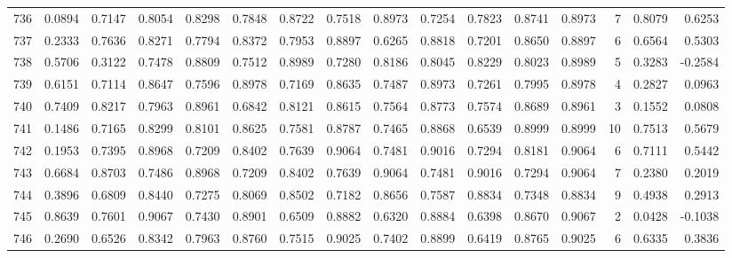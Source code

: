 \begin{tabular}{lrrrrrrrrrrrrrrr}
736 &      0.0894 &  0.7147 &  0.8054 &  0.8298 &  0.7848 &  0.8722 &  0.7518 &  0.8973 &  0.7254 &  0.7823 &   0.8741 &     0.8973 &      7 &                    0.8079 &                     0.6253 \\
737 &      0.2333 &  0.7636 &  0.8271 &  0.7794 &  0.8372 &  0.7953 &  0.8897 &  0.6265 &  0.8818 &  0.7201 &   0.8650 &     0.8897 &      6 &                    0.6564 &                     0.5303 \\
738 &      0.5706 &  0.3122 &  0.7478 &  0.8809 &  0.7512 &  0.8989 &  0.7280 &  0.8186 &  0.8045 &  0.8229 &   0.8023 &     0.8989 &      5 &                    0.3283 &                    -0.2584 \\
739 &      0.6151 &  0.7114 &  0.8647 &  0.7596 &  0.8978 &  0.7169 &  0.8635 &  0.7487 &  0.8973 &  0.7261 &   0.7995 &     0.8978 &      4 &                    0.2827 &                     0.0963 \\
740 &      0.7409 &  0.8217 &  0.7963 &  0.8961 &  0.6842 &  0.8121 &  0.8615 &  0.7564 &  0.8773 &  0.7574 &   0.8689 &     0.8961 &      3 &                    0.1552 &                     0.0808 \\
741 &      0.1486 &  0.7165 &  0.8299 &  0.8101 &  0.8625 &  0.7581 &  0.8787 &  0.7465 &  0.8868 &  0.6539 &   0.8999 &     0.8999 &     10 &                    0.7513 &                     0.5679 \\
742 &      0.1953 &  0.7395 &  0.8968 &  0.7209 &  0.8402 &  0.7639 &  0.9064 &  0.7481 &  0.9016 &  0.7294 &   0.8181 &     0.9064 &      6 &                    0.7111 &                     0.5442 \\
743 &      0.6684 &  0.8703 &  0.7486 &  0.8968 &  0.7209 &  0.8402 &  0.7639 &  0.9064 &  0.7481 &  0.9016 &   0.7294 &     0.9064 &      7 &                    0.2380 &                     0.2019 \\
744 &      0.3896 &  0.6809 &  0.8440 &  0.7275 &  0.8069 &  0.8502 &  0.7182 &  0.8656 &  0.7587 &  0.8834 &   0.7348 &     0.8834 &      9 &                    0.4938 &                     0.2913 \\
745 &      0.8639 &  0.7601 &  0.9067 &  0.7430 &  0.8901 &  0.6509 &  0.8882 &  0.6320 &  0.8884 &  0.6398 &   0.8670 &     0.9067 &      2 &                    0.0428 &                    -0.1038 \\
746 &      0.2690 &  0.6526 &  0.8342 &  0.7963 &  0.8760 &  0.7515 &  0.9025 &  0.7402 &  0.8899 &  0.6419 &   0.8765 &     0.9025 &      6 &                    0.6335 &                     0.3836 \\

\end{tabular}
